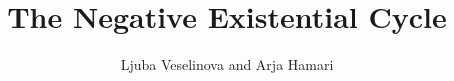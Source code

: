 \title{The Negative Existential Cycle} 
\subtitle{}%
\author{Ljuba Veselinova and Arja Hamari}
\renewcommand{\lsSeries}{rcg}%
\renewcommand{\lsSeriesNumber}{1}
